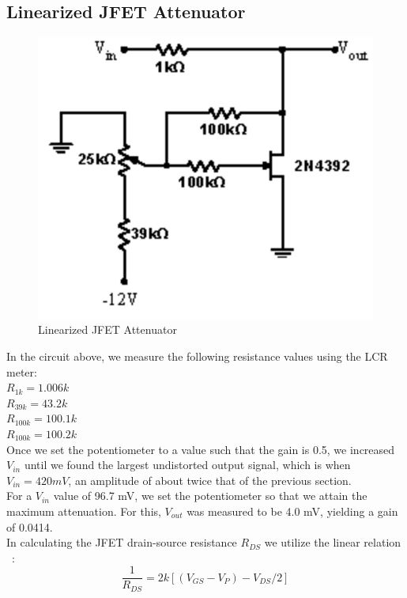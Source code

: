 \documentclass{article}
\begin{document}
\subsection{Linearized JFET Attenuator}
    \begin{figure}[H]
        \centering
        \includegraphics[scale = 0.6]{5_8.png}
        \caption{Linearized JFET Attenuator~\cite{webfig}}
        \label{fig:my_label}
    \end{figure}
    In the circuit above, we measure the following resistance values using the LCR meter:\\
    $R_{1k} = 1.006k$\\
    $R_{39k} = 43.2k$\\
    $R_{100k} = 100.1k$\\
    $R_{100k} = 100.2k$\\\indent Once we set the potentiometer to a value such that the gain is 0.5, we increased $V_{in}$ until we found the largest undistorted output signal, which is when $V_{in} = 420 mV$, an amplitude of about twice that of the previous section.\\\indent For a $V_{in}$ value of 96.7 mV, we set the potentiometer so that we attain the maximum attenuation. For this, $V_{out}$ was measured to be 4.0 mV, yielding a gain of 0.0414.\\\indent In calculating the JFET drain-source resistance $R_{DS}$ we utilize the linear relation ~\cite{webfig}:
    \begin{equation}
        \frac{1}{R_{DS}} = 2k[(V_{GS}-V_P)-V_{DS}/2]
    \end{equation}
\end{document}
